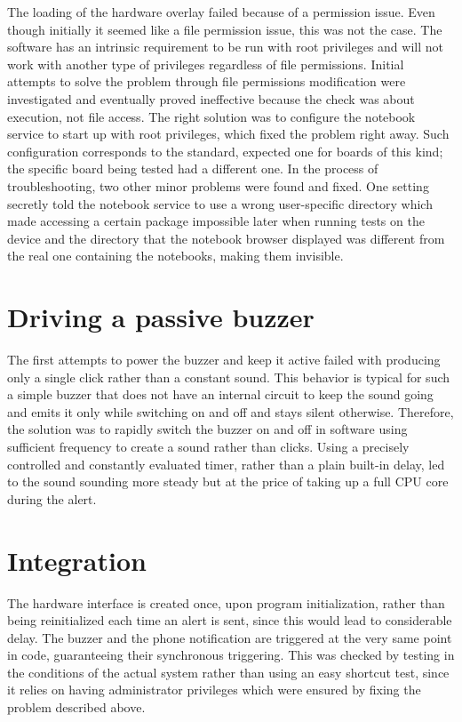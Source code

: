The loading of the hardware overlay failed because of a permission issue. Even though initially it seemed like a file permission issue, this was not the case. The software has an intrinsic requirement to be run with root privileges and will not work with another type of privileges regardless of file permissions. Initial attempts to solve the problem through file permissions modification were investigated and eventually proved ineffective because the check was about execution, not file access. The right solution was to configure the notebook service to start up with root privileges, which fixed the problem right away. Such configuration corresponds to the standard, expected one for boards of this kind; the specific board being tested had a different one. In the process of troubleshooting, two other minor problems were found and fixed. One setting secretly told the notebook service to use a wrong user-specific directory which made accessing a certain package impossible later when running tests on the device and the directory that the notebook browser displayed was different from the real one containing the notebooks, making them invisible.

\section{Driving a passive buzzer}

The first attempts to power the buzzer and keep it active failed with producing only a single click rather than a constant sound. This behavior is typical for such a simple buzzer that does not have an internal circuit to keep the sound going and emits it only while switching on and off and stays silent otherwise. Therefore, the solution was to rapidly switch the buzzer on and off in software using sufficient frequency to create a sound rather than clicks. Using a precisely controlled and constantly evaluated timer, rather than a plain built-in delay, led to the sound sounding more steady but at the price of taking up a full CPU core during the alert.

\section{Integration}

The hardware interface is created once, upon program initialization, rather than being reinitialized each time an alert is sent, since this would lead to considerable delay. The buzzer and the phone notification are triggered at the very same point in code, guaranteeing their synchronous triggering. This was checked by testing in the conditions of the actual system rather than using an easy shortcut test, since it relies on having administrator privileges which were ensured by fixing the problem described above.

